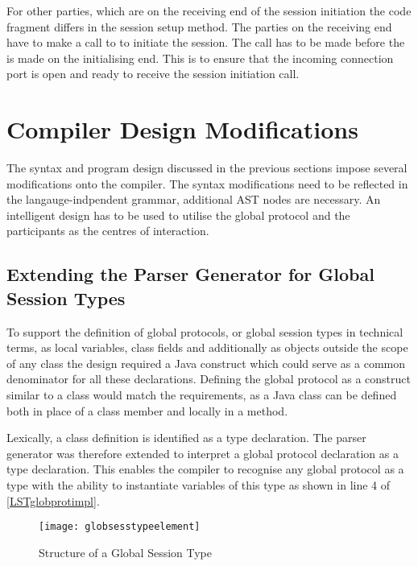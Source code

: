 For other parties, which are on the receiving end of the session initiation the code fragment differs in the session setup method. The parties on the receiving end have to make a call to  to initiate the session. The call has to be made before the  is made on the initialising end. This is to ensure that the incoming connection port is open and ready to receive the session initiation call.

\section{Compiler Design Modifications}

The syntax and program design discussed in the previous sections impose several modifications onto the compiler. The syntax modifications need to be reflected in the langauge-indpendent grammar, additional AST nodes are necessary. An intelligent design has to be used to utilise the global protocol and the participants as the centres of interaction.

\subsection{Extending the Parser Generator for Global Session Types}
\label{subsec:extendingparsegen}

To support the definition of global protocols, or global session types in technical terms, as local variables, class fields and additionally as objects outside the scope of any class the design required a Java construct which could serve as a common denominator for all these declarations. Defining the global protocol as a construct similar to a class would match the requirements, as a Java class can be defined both in place of a class member and locally in a method. 

Lexically, a class definition is identified as a type declaration. The parser generator was therefore extended to interpret a global protocol declaration as a type declaration. This enables the compiler to recognise any global protocol as a type with the ability to instantiate variables of this type as shown in line 4 of \autoref{LSTglobprotimpl}.

\begin{figure}[H]
\begin{center}
\texttt{[image: globsesstypeelement]}
\caption{Structure of a Global Session Type}
\label{fig:globsesstypelement}
\end{center}
\end{figure}

